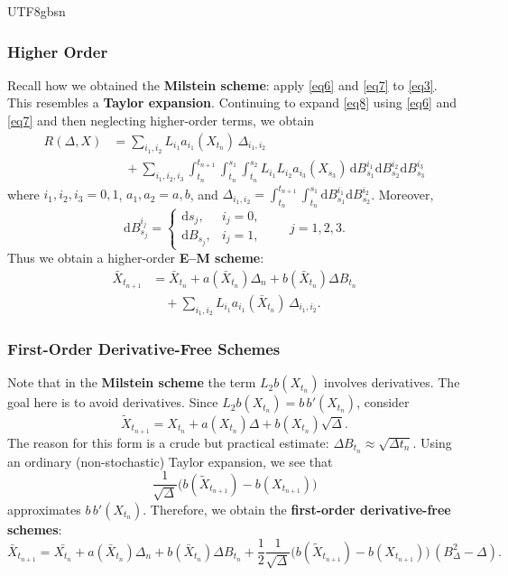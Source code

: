 \documentclass{article}
\begin{document}
\begin{CJK*}{UTF8}{gbsn}
\subsubsection{Higher Order}
Recall how we obtained the \textbf{Milstein scheme}: apply \ref{eq6} and \ref{eq7} to \ref{eq3}. This resembles a \textbf{Taylor expansion}. Continuing to expand \ref{eq8} using \ref{eq6} and \ref{eq7} and then neglecting higher-order terms, we obtain
$$\begin{aligned}
R(\Delta,X)
&=\sum_{i_1,i_2}L_{i_1}a_{i_1}(X_{t_n})\,\Delta_{i_1,i_2}\\
&\quad+\sum_{i_1,i_2,i_3}\int_{t_n}^{t_{n+1}}\!\int_{t_n}^{s_1}\!\int_{t_n}^{s_2}
L_{i_1}L_{i_2}a_{i_3}(X_{s_3})\,\mathrm{d}B_{s_1}^{i_1}\mathrm{d}B_{s_2}^{i_2}\mathrm{d}B_{s_3}^{i_3}
\end{aligned}$$
where $i_1,i_2,i_3=0,1$, $a_1,a_2=a,b$, and $\Delta_{i_1,i_2}=\int_{t_n}^{t_{n+1}}\int_{t_n}^{s_1}\mathrm{d}B_{s_1}^{i_1}\mathrm{d}B_{s_2}^{i_2}$.
Moreover,
$$
\mathrm{d}B_{s_j}^{i_j}=\begin{cases}
\mathrm{d}s_j,& i_j=0,\\
\mathrm{d}B_{s_j},& i_j=1,
\end{cases}
\qquad j=1,2,3.
$$
Thus we obtain a higher-order \textbf{E–M scheme}:
$$
\begin{aligned}
    \bar{X}_{t_{n+1}}
    &=\bar{X}_{t_n}+a(\bar{X}_{t_{n}})\Delta_n+b(\bar{X}_{t_{n}})\Delta B_{t_n}\\
    &\quad+\sum_{i_1,i_2}L_{i_1}a_{i_1}(\bar{X}_{t_n})\,\Delta_{i_1,i_2}.
\end{aligned}
$$

\subsubsection{First-Order Derivative-Free Schemes}
Note that in the \textbf{Milstein scheme} the term $L_2 b(X_{t_n})$ involves derivatives. The goal here is to avoid derivatives. Since $L_2 b(X_{t_n})=b\,b'(X_{t_n})$, consider
$$
\tilde{X}_{t_{n+1}}=X_{t_n}+a(X_{t_n})\Delta+b(X_{t_n})\sqrt{\Delta}.
$$
The reason for this form is a crude but practical estimate: $\Delta B_{t_n}\approx\sqrt{\Delta t_{n}}$.
Using an ordinary (non-stochastic) Taylor expansion, we see that
$$
\frac{1}{\sqrt{\Delta}}\big(b(\tilde{X}_{t_{n+1}})-b({X}_{t_{n+1}})\big)
$$
approximates $b\,b'(X_{t_n})$. Therefore, we obtain the \textbf{first-order derivative-free schemes}:
$$
\bar{X}_{t_{n+1}}=\bar{X_{t_n}}+a(\bar{X}_{t_{n}})\Delta_n+b(\bar{X}_{t_{n}})\Delta B_{t_n}
+\frac{1}{2}\frac{1}{\sqrt{\Delta}}\big(b(\tilde{X}_{t_{n+1}})-b({X}_{t_{n+1}})\big)\,(B_\Delta^2-\Delta).
$$


\end{CJK*}
\end{document}

